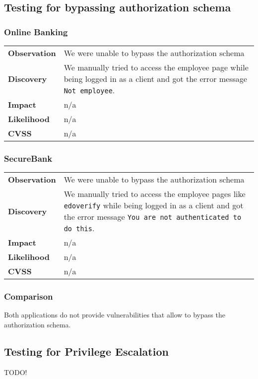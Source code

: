 \clearpage
\subsection{Testing for bypassing authorization schema}


\subsubsection*{Online Banking}

\begin{tabular}{l|p{10cm}}

\textbf{Observation} & We were unable to bypass the authorization schema \\
\textbf{Discovery} & We manually tried to access the employee page while being logged in as a client and got the error message \texttt{Not employee}. \\
\textbf{Impact} & n/a \\
\textbf{Likelihood} & n/a \\
\textbf{CVSS} & n/a \\
\end{tabular}

\subsubsection*{SecureBank}

\begin{tabular}{l|p{10cm}}

\textbf{Observation} &  We were unable to bypass the authorization schema \\
\textbf{Discovery} & We manually tried to access the employee pages like \texttt{edoverify} while being logged in as a client and got the error message \texttt{You are not authenticated to do this}. \\
\textbf{Impact} & n/a \\
\textbf{Likelihood} & n/a \\
\textbf{CVSS} & n/a \\
\end{tabular}

\subsubsection*{Comparison}
Both applications do not provide vulnerabilities that allow to bypass the authorization schema.

\clearpage

\subsection{Testing for Privilege Escalation}
TODO!
